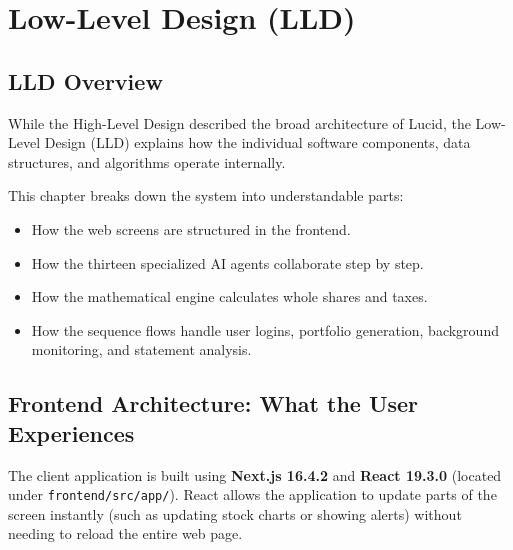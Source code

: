 \chapter{Low-Level Design (LLD)}

\section{LLD Overview}
While the High-Level Design described the broad architecture of Lucid, the Low-Level Design (LLD) explains how the individual software components, data structures, and algorithms operate internally. 

This chapter breaks down the system into understandable parts:
\begin{itemize}
    \item How the web screens are structured in the frontend.
    \item How the thirteen specialized AI agents collaborate step by step.
    \item How the mathematical engine calculates whole shares and taxes.
    \item How the sequence flows handle user logins, portfolio generation, background monitoring, and statement analysis.
\end{itemize}

\section{Frontend Architecture: What the User Experiences}
The client application is built using \textbf{Next.js 16.4.2} and \textbf{React 19.3.0} (located under \texttt{frontend/src/app/}). React allows the application to update parts of the screen instantly (such as updating stock charts or showing alerts) without needing to reload the entire web page.

